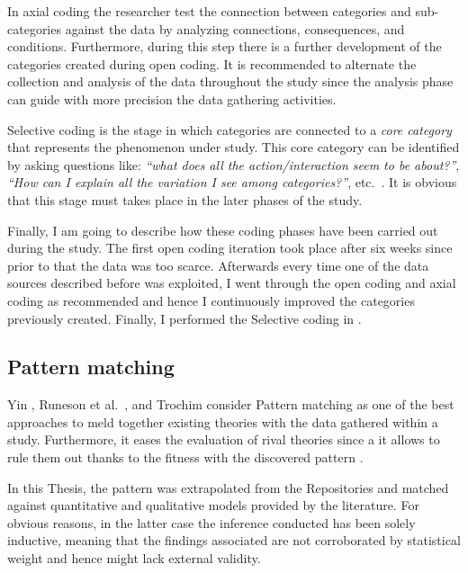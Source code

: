 In axial coding the researcher test the connection between categories and sub-categories against the data by analyzing connections, consequences, and conditions. Furthermore, during this step there is a further development of the categories created during open coding. It is recommended to alternate the collection and analysis of the data throughout the study since the analysis phase can guide with more precision the data gathering activities.

Selective coding is the stage in which categories are connected to a \textit{core category} that represents the phenomenon under study. This core category can be identified by asking questions like: \textit{``what does all the action/interaction seem to be about?''}, \textit{``How can I explain all the variation I see among categories?''}, etc.\ \cite{coding_guidelines}. It is obvious that this stage must takes place in the later phases of the study.

Finally, I am going to describe how these coding phases have been carried out during the study. The first open coding iteration took place after six weeks since prior to that the data was too scarce. Afterwards every time one of the data sources described before was exploited, I went through the open coding and axial coding as recommended and hence  I continuously improved the categories previously created. Finally, I performed the Selective coding in .


\subsection{Pattern matching}
Yin \cite{case_study_guide}, Runeson et al.\ \cite{case_study_software_engineering}, and Trochim \cite{pattern_matching} consider Pattern matching as one of the best approaches to meld together existing theories with the data gathered within a study. Furthermore, it eases the evaluation of rival theories since a it allows to rule them out thanks to the fitness with the discovered pattern \cite{pattern_matching}.

In this Thesis, the pattern was extrapolated from the Repositories and matched against quantitative and qualitative models provided by the literature. For obvious reasons, in the latter case the inference conducted has been solely inductive, meaning that the findings associated are not corroborated by statistical weight and hence might lack external validity.

